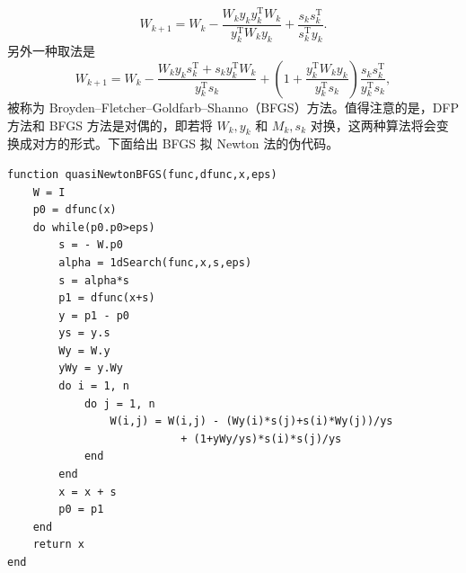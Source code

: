 \begin{equation}
W_{k+1}=W_k-\frac{W_k y_k y_k^{\mathrm T}W_k}{y_k^{\mathrm T}W_k y_k}
+\frac{s_k s_k^{\mathrm T}}{s_k^{\mathrm T}y_k}.
\tag{4.1.21}
\end{equation}
另外一种取法是
\begin{equation}
W_{k+1}=W_k-
\frac{W_k y_k s_k^{\mathrm T}+s_k y_k^{\mathrm T}W_k}{y_k^{\mathrm T}s_k}
+\left(1+\frac{y_k^{\mathrm T}W_k y_k}{y_k^{\mathrm T}s_k}\right)
\frac{s_k s_k^{\mathrm T}}{y_k^{\mathrm T}s_k},
\tag{4.1.22}
\end{equation}
被称为 Broyden--Fletcher--Goldfarb--Shanno（BFGS）方法。值得注意的是，DFP 方法和 BFGS 方法是对偶的，即若将 $W_k,y_k$ 和 $M_k,s_k$ 对换，这两种算法将会变换成对方的形式。下面给出 BFGS 拟 Newton 法的伪代码。

\begin{algorithmBox}
\begin{lstlisting}[style=bellacode]
function quasiNewtonBFGS(func,dfunc,x,eps)
    W = I
    p0 = dfunc(x)
    do while(p0.p0>eps)
        s = - W.p0
        alpha = 1dSearch(func,x,s,eps)
        s = alpha*s
        p1 = dfunc(x+s)
        y = p1 - p0
        ys = y.s
        Wy = W.y
        yWy = y.Wy
        do i = 1, n
            do j = 1, n
                W(i,j) = W(i,j) - (Wy(i)*s(j)+s(i)*Wy(j))/ys
                           + (1+yWy/ys)*s(i)*s(j)/ys
            end
        end
        x = x + s
        p0 = p1
    end
    return x
end
\end{lstlisting}
\end{algorithmBox}

